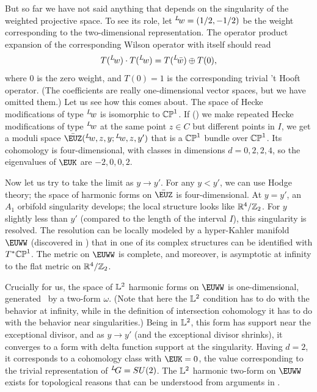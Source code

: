 But so far we have not said anything that depends on the
singularity of the weighted projective space. To see its role, let
$^L\negthinspace w=(1/2,-1/2)$ be the weight corresponding to the
two-dimensional representation.  The operator product expansion of
the corresponding Wilson operator with itself should read
\setcounter{equation}{30}
\begin{equation}\label{eq:murtog}
T({}^L\negthinspace w)\cdot T({}^L\negthinspace
w)=T({}^L\negthinspace\bar w)\oplus T(0),
\end{equation}
 where $0$ is the zero weight,
and $T(0)=1$ is the corresponding trivial 't Hooft operator. (The coefficients are
really one-dimensional vector spaces, but we have omitted them.)  Let
us see how this comes about.  The space of Hecke modifications of
type $^L\negthinspace w$ is isomorphic to $\Bbb{CP}^1$. If
(\xytampo) we make repeated Hecke modifications of type
$^L\negthinspace w$ at the same point $z\in C$ but different
points in $I$, we get a moduli space $\bar\EUZ({}^L\negthinspace
w,z,y;{}^L\negthinspace w,z,y')$ that is a $\Bbb{CP}^1$ bundle
over $\Bbb{CP}^1$.  Its cohomology is four-dimensional, with
classes in dimensions $d=0,2,2,4$, so the eigenvalues of $\EUK$
are $-2,0,0,2$.

Now let us try to take the limit as $y\to y'$. For any $y<y'$, we
can use Hodge theory; the space of harmonic forms on $\bar\EUZ$ is
four-dimensional.  At $y=y'$, an $A_1$ orbifold singularity
develops; the local structure looks like $\Bbb{R}^4/\Bbb{Z}_2$.
For $y$ slightly less than $y'$ (compared to the length of the
interval $I$), this singularity is resolved.  The resolution can
be locally modeled by  a  hyper-Kahler manifold $\EUWW$
(discovered in \cite{ref130}) that in one of its complex structures can be identified
with $T^*\Bbb{CP}^1$. The metric on $\EUWW$ is complete, and
moreover, is asymptotic at infinity to the flat metric on
$\Bbb{R}^4/\Bbb{Z}_2$.

Crucially for us, the space of ${\Bbb{L}}^2$ harmonic forms on
$\EUWW$ is one-dimensional, generated  \cite{ref130}\ by a two-form
$\omega$. (Note that here the ${\Bbb{L}}^2$ condition has to do
with the behavior at infinity, while in the definition of
intersection cohomology it has to do with the behavior near
singularities.) Being in ${\Bbb{L}}^2$, this form has support near
the exceptional divisor, and as $y\to y'$ (and the exceptional
divisor shrinks), it converges to a form with delta function
support at the singularity. Having $d=2$, it corresponds to a
cohomology class with $\EUK=0$, the value corresponding to the
trivial representation of $^L\negthinspace G=SU(2)$. The
${\Bbb{L}}^2$ harmonic two-form on $\EUWW$ exists for topological
reasons that can be understood from arguments in \cite{ref131}.

